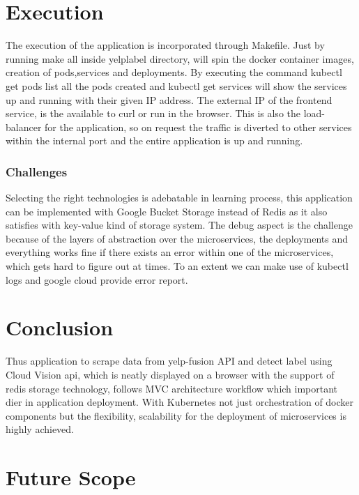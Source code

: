 \section{Execution}

The execution of the application is incorporated through
Makefile. Just by running make all inside yelplabel directory, will
spin the docker container images, creation of pods,services and
deployments. By executing the command kubectl get pods list all the
pods created and kubectl get services will show the services up and
running with their given IP address. The external IP of the frontend
service, is the available to curl or run in the browser. This is also
the load-balancer for the application, so on request the traffic is
diverted to other services within the internal port and the entire
application is up and running.
  
\subsubsection{Challenges} 

Selecting the right technologies is adebatable in learning process,
this application can be implemented with Google Bucket Storage instead
of Redis as it also satisfies with key-value kind of storage
system. The debug aspect is the challenge because of the layers of
abstraction over the microservices, the deployments and everything
works fine if there exists an error within one of the microservices,
which gets hard to figure out at times. To an extent we can make use
of kubectl logs and google cloud provide error report.
  
\section{Conclusion}

Thus application to scrape data from yelp-fusion API and detect label
using Cloud Vision api, which is neatly displayed on a browser with
the support of redis storage technology, follows MVC architecture
workflow which important dier in application deployment. With
Kubernetes not just orchestration of docker components but the
flexibility, scalability for the deployment of microservices is highly
achieved.
  
\section{Future Scope}


